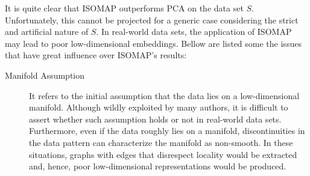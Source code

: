 \documentclass[12pt]{report}
\begin{document}
It is quite clear that ISOMAP outperforms PCA on the data set $S$. Unfortunately, this cannot be projected for a generic case considering the strict and artificial nature of $S$. In real-world data sets, the application of ISOMAP may lead to poor low-dimensional embeddings. \cite{herik2009} Bellow are listed some the issues that have great influence over ISOMAP's results:
\begin{description}
	\item[Manifold Assumption] It refers to the initial assumption that the data lies on a low-dimensional manifold. Although wildly exploited by many authors, it is difficult to assert whether such assumption holds or not in real-world data sets. \cite{lin2008riemannian} Furthermore, even if the data roughly lies on a manifold, discontinuities in the data pattern can characterize the manifold as non-smooth. In these situations, graphs with edges that disrespect locality would be extracted and, hence, poor low-dimensional representations would be produced.

	\newpage


\end{description}
\end{document}
